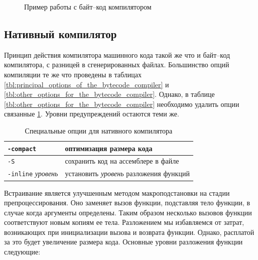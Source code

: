 \begin{figure}[h]
	\caption{\label{fig:session_with_bytecode_compiler}Пример работы с байт--код
компилятором}
\end{figure}

\subsection{Нативный компилятор}

Принцип действия компилятора машинного кода такой же что и байт--код
компилятора, с разницей в сгенерированных файлах. Большинство опций компиляции
те же что проведены в таблицах
\ref{tbl:principal_options_of_the_bytecode_compiler} и
\ref{tbl:other_options_for_the_bytecode_compiler}. Однако, в таблице
\ref{tbl:other_options_for_the_bytecode_compiler} необходимо удалить опции
связанные \ref{tbl:options_specific_to_the_native_compiler}. Уровни
предупреждений остаются теми же.

\begin{table}
	\begin{tabular}{|l|l|}
	\hline
	\texttt{-compact} & оптимизация размера кода \\
	\hline
	\texttt{-S} & сохранить код на ассемблере в файле \\
	\hline
	\texttt{-inline} \it{уровень} & установить {\it уровень} \enq{агрессивности}
разложения функций \\
	\hline
	\end{tabular}
	\caption{\label{tbl:options_specific_to_the_native_compiler}Специальные
опции для нативного компилятора}
\end{table}

Встраивание является улучшенным методом макроподстановки на стадии
препроцессирования. Оно заменяет вызов функции, подставляя тело функции, в
случае когда аргументы определены. Таким образом несколько вызовов функции
соответствуют новым копиям ее тела. Разложением мы избавляемся от затрат,
возникающих при инициализации вызова и возврата функции. Однако, расплатой за
это будет увеличение размера кода. Основные уровни разложения функции следующие:

